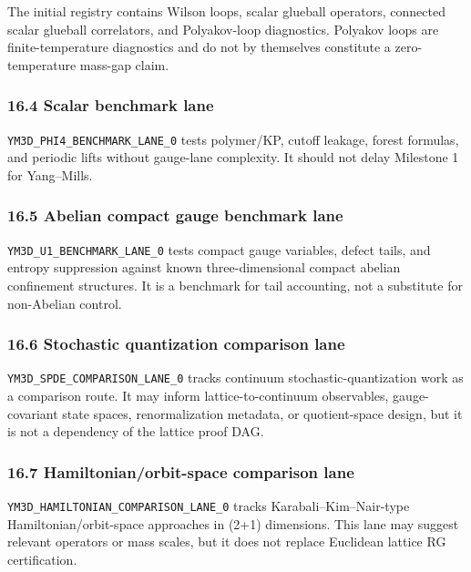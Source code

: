 \documentclass[
]{article}
\begin{document}
The initial registry contains Wilson loops, scalar glueball operators,
connected scalar glueball correlators, and Polyakov-loop diagnostics.
Polyakov loops are finite-temperature diagnostics and do not by
themselves constitute a zero-temperature mass-gap claim.

\subsubsection{16.4 Scalar benchmark lane}\label{scalar-benchmark-lane}

\texttt{YM3D\_PHI4\_BENCHMARK\_LANE\_0} tests polymer/KP, cutoff
leakage, forest formulas, and periodic lifts without gauge-lane
complexity. It should not delay Milestone 1 for Yang--Mills.

\subsubsection{16.5 Abelian compact gauge benchmark
lane}\label{abelian-compact-gauge-benchmark-lane}

\texttt{YM3D\_U1\_BENCHMARK\_LANE\_0} tests compact gauge variables,
defect tails, and entropy suppression against known three-dimensional
compact abelian confinement structures. It is a benchmark for tail
accounting, not a substitute for non-Abelian control.

\subsubsection{16.6 Stochastic quantization comparison
lane}\label{stochastic-quantization-comparison-lane}

\texttt{YM3D\_SPDE\_COMPARISON\_LANE\_0} tracks continuum
stochastic-quantization work as a comparison route. It may inform
lattice-to-continuum observables, gauge-covariant state spaces,
renormalization metadata, or quotient-space design, but it is not a
dependency of the lattice proof DAG.

\subsubsection{16.7 Hamiltonian/orbit-space comparison
lane}\label{hamiltonianorbit-space-comparison-lane}

\texttt{YM3D\_HAMILTONIAN\_COMPARISON\_LANE\_0} tracks
Karabali--Kim--Nair-type Hamiltonian/orbit-space approaches in (2+1)
dimensions. This lane may suggest relevant operators or mass scales, but
it does not replace Euclidean lattice RG certification.
\end{document}
